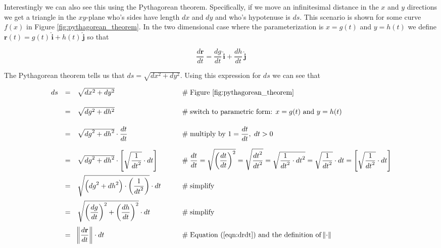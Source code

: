 \documentclass{article}
\theoremstyle{definition}
\begin{document}
\bigskip
\noindent
Interestingly we can also see this using the Pythagorean theorem.
Specifically, if we move an infinitesimal distance in the $x$ and
$y$ directions we get a triangle in the $xy$-plane who's sides
have length $dx$ and $dy$ and who's hypotenuse is $ds$. This
scenario is shown for some curve $f(x)$ in Figure \ref{fig:pythagorean_theorem}. 
In the two dimensional case where the parameterization is $x = g(t)$ 
and $y = h(t)$ we define $\mathbf{r}(t) = g(t) \, \hat{\mathbf{i}} + 
h(t) \, \hat{\mathbf{j}}$ so that

\bigskip
\begin{equation}
\dfrac{d\mathbf{r}}{dt} = \dfrac{dg}{dt} \, \hat{\mathbf{i}} + \dfrac{dh}{dt} \, \hat{\mathbf{j}}
\label{eqn:drdt}
\end{equation}


\bigskip
\noindent
The Pythagorean theorem tells us that 
$ds = \sqrt{dx^2 + dy^2}$. Using
this expression for $ds$ we can see that

\bigskip
\begin{equation*}
\begin{array}{lllll}
ds
&=& \sqrt{dx^2 + dy^2}				
			&\hspace{2em} \mathrel{\#} \text{Figure \ref{fig:pythagorean_theorem}} \\
[14pt]
&=& \sqrt{dg^2 + dh^2}	
			&\hspace{2em} \mathrel{\#} \text{switch to parametric form: 
			$x = g(t)$ and $y = h(t)$} \\
[14pt]
&=& \sqrt{{dg}^2 + {dh}^2} \cdot \dfrac{dt}{dt}
			&\hspace{2em} \mathrel{\#} \text{multiply by 
			$1 = \dfrac{dt}{dt}, \; dt > 0$}  \\
[14pt]
&=& \sqrt{{dg}^2 + {dh}^2} \cdot \Bigg [\sqrt{\dfrac{1}{{dt}^2}} \cdot dt \Bigg ]
			&\hspace{2em} \mathrel{\#} \dfrac{dt}{dt} 
			= \sqrt{\left (\dfrac{dt}{dt} \right)^2}
			= \sqrt{\dfrac{{dt}^2}{{dt}^2}}
			= \sqrt{\dfrac{1}{{dt}^2} \cdot {dt}^2} 
			= \sqrt{\dfrac{1}{{dt}^2}} \cdot dt
			= \left [ \sqrt{\dfrac{1}{{dt}^2}} \cdot dt \right ] \\
[14pt]
&=& \sqrt{\Big ( {dg}^2 + {dh}^2 \Big ) \cdot \left (\dfrac{1}{{dt}^2} \right)} \cdot dt
			&\hspace{2em} \mathrel{\#} \text{simplify} \\
[14pt]
&=& \sqrt{\left (\dfrac{dg}{dt} \right)^2 + \left (\dfrac{dh}{dt} \right)^2} \cdot dt		
			&\hspace{2em} \mathrel{\#} \text{simplify} \\
[14pt]
&=& \norm{\dfrac{d \mathbf{r}}{dt}} \cdot dt
			&\hspace{2em} \mathrel{\#} \text{Equation (\ref{eqn:drdt}) 
			and the definition of $\norm{\cdot}$}
\end{array}
\end{equation*}
\end{document}
